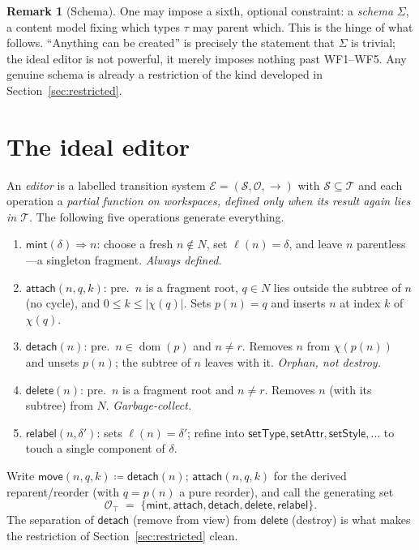 \documentclass[11pt]{article}
\DeclareMathOperator{\Dom}{dom}
\newcommand{\Tree}{\mathcal{T}}              %
\newcommand{\Edit}{\mathcal{E}}
\newcommand{\Ops}{\mathcal{O}}
\newcommand{\mint}{\mathsf{mint}}
\newcommand{\attach}{\mathsf{attach}}
\newcommand{\detach}{\mathsf{detach}}
\newcommand{\delete}{\mathsf{delete}}
\newcommand{\relabel}{\mathsf{relabel}}
\newcommand{\move}{\mathsf{move}}
\newcommand{\setType}{\mathsf{setType}}
\newcommand{\setStyle}{\mathsf{setStyle}}
\newcommand{\setAttr}{\mathsf{setAttr}}
\theoremstyle{definition}
\newtheorem{remark}[definition]{Remark}
\theoremstyle{plain}
\begin{document}
\begin{remark}[Schema]\label{rem:schema}
One may impose a sixth, optional constraint: a \emph{schema} $\Sigma$, a content
model fixing which types $\tau$ may parent which. This is the hinge of what
follows. ``Anything can be created'' is precisely the statement that $\Sigma$ is
trivial; the ideal editor is not powerful, it merely imposes nothing past
WF1--WF5. Any genuine schema is already a restriction of the kind developed in
Section~\ref{sec:restricted}.
\end{remark}

\section{The ideal editor}\label{sec:ideal}
An \emph{editor} is a labelled transition system $\Edit=(\mathcal S,\Ops,\to)$
with $\mathcal S\subseteq\Tree$ and each operation a \emph{partial function on
workspaces, defined only when its result again lies in $\Tree$}. The following
five operations generate everything.

\begin{enumerate}[label=\textup{(\arabic*)}, leftmargin=*, itemsep=3pt]
  \item $\mint(\delta)\Rightarrow n$: choose a fresh $n\notin N$, set
        $\ell(n)=\delta$, and leave $n$ parentless---a singleton fragment.
        \emph{Always defined.}
  \item $\attach(n,q,k)$: pre.\ $n$ is a fragment root, $q\in N$ lies outside the
        subtree of $n$ (no cycle), and $0\le k\le|\chi(q)|$. Sets $p(n)=q$ and
        inserts $n$ at index $k$ of $\chi(q)$.
  \item $\detach(n)$: pre.\ $n\in\Dom(p)$ and $n\ne r$. Removes $n$ from
        $\chi(p(n))$ and unsets $p(n)$; the subtree of $n$ leaves with it.
        \emph{Orphan, not destroy.}
  \item $\delete(n)$: pre.\ $n$ is a fragment root and $n\ne r$. Removes $n$
        (with its subtree) from $N$. \emph{Garbage-collect.}
  \item $\relabel(n,\delta')$: sets $\ell(n)=\delta'$; refine into
        $\setType,\setAttr,\setStyle,\dots$ to touch a single component of
        $\delta$.
\end{enumerate}

Write $\move(n,q,k)\coloneqq\detach(n);\,\attach(n,q,k)$ for the derived
reparent/reorder (with $q=p(n)$ a pure reorder), and call the generating set
\[
  \Ops_{\top}\;=\;\{\mint,\attach,\detach,\delete,\relabel\}.
\]
The separation of $\detach$ (remove from view) from $\delete$ (destroy) is what
makes the restriction of Section~\ref{sec:restricted} clean.
\end{document}
